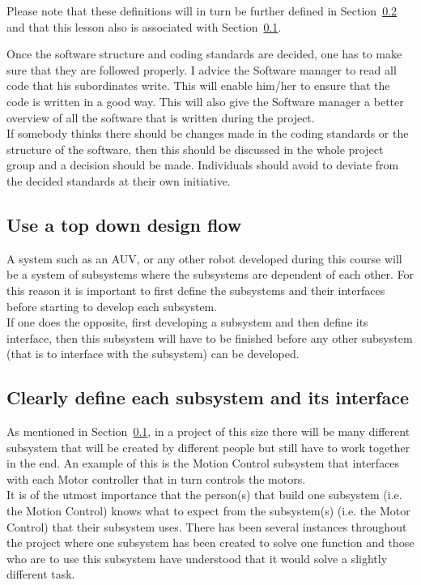 Please note that these definitions will in turn be further defined in Section~\ref{sec:define} and that this lesson also is associated with Section~\ref{sec:top_down}.

Once the software structure and coding standards are decided, one has to make sure that they are followed properly. I  advice the Software manager to read all code that his subordinates write. This will enable him/her to ensure that the code is written in a good way. This will also give the Software manager a better overview of all the software that is written during the project. \\
If somebody thinks there should be changes made in the coding standards or the structure of the software, then this should be discussed in the whole project group and a decision should be made. Individuals should avoid to deviate from the decided standards at their own initiative.


\subsection{Use a top down design flow}\label{sec:top_down}
A system such as an AUV, or any other robot developed during this course will be a system of subsystems where the subsystems are dependent of each other. For this reason it is important to first define the subsystems and their interfaces before starting to develop each subsystem. \\
If one does the opposite, first developing a subsystem and then define its interface, then this subsystem will have to be finished before any other subsystem (that is to interface with the subsystem) can be developed. 


\subsection{Clearly define each subsystem and its interface}\label{sec:define}
As mentioned in Section~\ref{sec:top_down}, in a project of this size there will be many different subsystem that will be created by different people but still have to work together in the end. An example of this is the Motion Control subsystem that interfaces with each Motor controller that in turn controls the motors. \\
It is of the utmost importance that the person(s) that build one subsystem (i.e. the Motion Control) knows what to expect from the subsystem(s) (i.e. the Motor Control) that their subsystem uses. There has been several instances throughout the project where one subsystem has been created to solve one function and those who are to use this subsystem have understood that it would solve a slightly different task. 

